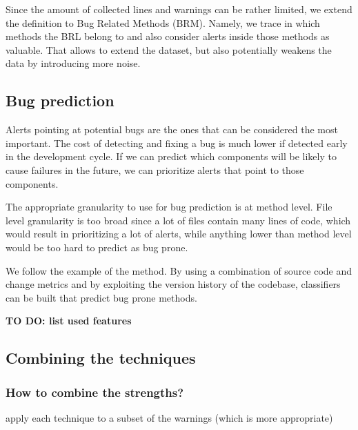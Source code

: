 \documentclass{article}
\begin{document}

Since the amount of collected lines and warnings can be rather limited, we extend the definition to Bug Related Methods (BRM). Namely, we trace in which methods the BRL belong to and also consider alerts inside those methods as valuable. That allows to extend the dataset, but also potentially weakens the data by introducing more noise.


\subsection{Bug prediction}

Alerts pointing at potential bugs are the ones that can be considered the most important. The cost of detecting and fixing a bug is much lower if detected early in the development cycle. If we can predict which components will be likely to cause failures in the future, we can prioritize alerts that point to those components. 

The appropriate granularity to use for bug prediction is at method level. File level granularity is too broad since a lot of files contain many lines of code, which would result in prioritizing a lot of alerts, while anything lower than method level would be too hard to predict as bug prone.

We follow the example of the \cite{prediction_method} method. By using a combination of source code and change metrics and by exploiting the version history of the codebase, classifiers can be built that predict bug prone methods.

\textbf{TO DO: list used features}


\subsection{Combining the techniques}

\subsubsection{How to combine the strengths?}
apply each technique to a subset of the warnings (which is more appropriate)
\end{document}
